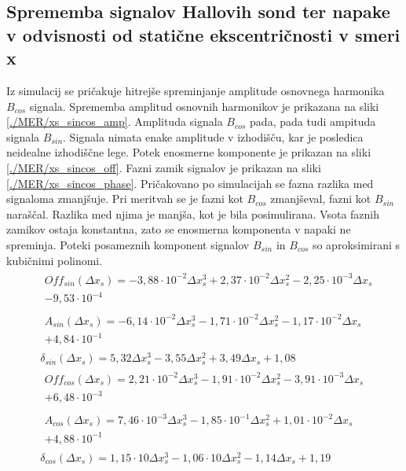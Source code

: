 \subsection{Sprememba signalov Hallovih sond ter napake v odvisnosti od statične ekscentričnosti v smeri x}
Iz simulacij se pričakuje hitrejše spreminjanje amplitude osnovnega harmonika $B_{cos}$ signala. Sprememba amplitud osnovnih harmonikov je prikazana na sliki \ref{./MER/xs_sincos_amp}. Amplituda signala $B_{cos}$ pada, pada tudi ampituda signala $B_{sin}$. Signala nimata enake amplitude v izhodišču, kar je posledica neidealne izhodiščne lege. Potek enosmerne komponente je prikazan na sliki \ref{./MER/xs_sincos_off}. Fazni zamik signalov je prikazan na sliki \ref{./MER/xs_sincos_phase}. Pričakovano po simulacijah se fazna razlika med signaloma zmanjšuje. Pri meritvah se je fazni kot $B_{cos}$ zmanjševal, fazni kot $B_{sin}$ naraščal. Razlika med njima je manjša, kot je bila posimulirana. Vsota faznih zamikov ostaja konstantna, zato se enosmerna komponenta v napaki ne spreminja.
Poteki posameznih komponent signalov $B_{sin}$ in $B_{cos}$ so aproksimirani s kubičnimi polinomi.
\begin{eqnarray}
&\begin{split}Off_{sin} (\Delta x_s) =-3,88\cdot 10^{-2}\Delta x_s^{3}+2,37\cdot 10^{-2}\Delta x_s^{2}-2,25\cdot 10^{-3}\Delta x_s\\-9,53\cdot 10^{-4} \end{split}\\
&\begin{split}A_{sin}(\Delta x_s) =-6,14\cdot 10^{-2}\Delta x_s^{3}-1,71\cdot 10^{-2}\Delta x_s^{2}-1,17\cdot 10^{-2}\Delta x_s\\+4,84\cdot 10^{-1} \end{split}\\  
&\delta_{sin} (\Delta x_s) =5,32\Delta x_s^{3}-3,55\Delta x_s^{2}+3,49\Delta x_s+1,08 \\                                                  
&\begin{split}Off_{cos} (\Delta x_s) =2,21\cdot 10^{-2}\Delta x_s^{3}-1,91\cdot 10^{-2}\Delta x_s^{2}-3,91\cdot 10^{-3}\Delta x_s\\+6,48\cdot 10^{-3} \end{split}\\ 
&\begin{split}A_{cos} (\Delta x_s) =7,46\cdot 10^{-3}\Delta x_s^{3}-1,85\cdot 10^{-1}\Delta x_s^{2}+1,01\cdot 10^{-2}\Delta x_s\\+4,88\cdot 10^{-1} \end{split}\\   
&\delta_{cos} (\Delta x_s) =1,15\cdot 10\Delta x_s^{3}-1,06\cdot 10\Delta x_s^{2}-1,14\Delta x_s+1,19
\end{eqnarray}


